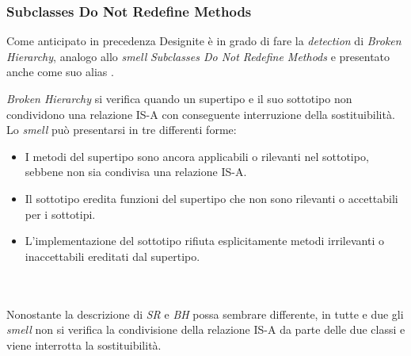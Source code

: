 \subsubsection{Subclasses Do Not Redefine Methods} 
    Come anticipato in precedenza Designite è in grado di fare la \textit{detection} di \textit{Broken Hierarchy}, analogo allo \textit{smell} \textit{Subclasses Do Not Redefine Methods} e presentato anche come suo alias \cite{SURYANARAYANA201521}.
    
    \textit{Broken Hierarchy} si verifica quando un supertipo e il suo sottotipo non condividono una relazione IS-A con conseguente interruzione della sostituibilità. Lo \textit{smell} può presentarsi in tre differenti forme:
    \begin{itemize}
        \item I metodi del supertipo sono ancora applicabili o rilevanti nel sottotipo, sebbene non sia condivisa una relazione IS-A.
        
        \item Il sottotipo eredita funzioni del supertipo che non sono rilevanti o accettabili per i sottotipi.
        
        \item L'implementazione del sottotipo rifiuta esplicitamente metodi irrilevanti o inaccettabili ereditati dal supertipo.
    \end{itemize} \\
    \\
    Nonostante la descrizione di \textit{SR} e \textit{BH} possa sembrare differente, in tutte e due gli \textit{smell} non si verifica la condivisione della relazione IS-A da parte delle due classi e viene interrotta la sostituibilità. 
    
